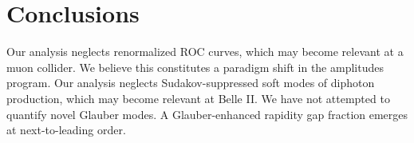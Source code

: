 \section{Conclusions}\label{sec:conclusions}

Our analysis neglects renormalized ROC curves, which may become relevant
at a muon collider. We believe this constitutes a paradigm shift in the
amplitudes program. Our analysis neglects Sudakov-suppressed soft modes
of diphoton production, which may become relevant at Belle II. We have
not attempted to quantify novel Glauber modes. A Glauber-enhanced
rapidity gap fraction emerges at next-to-leading order.

